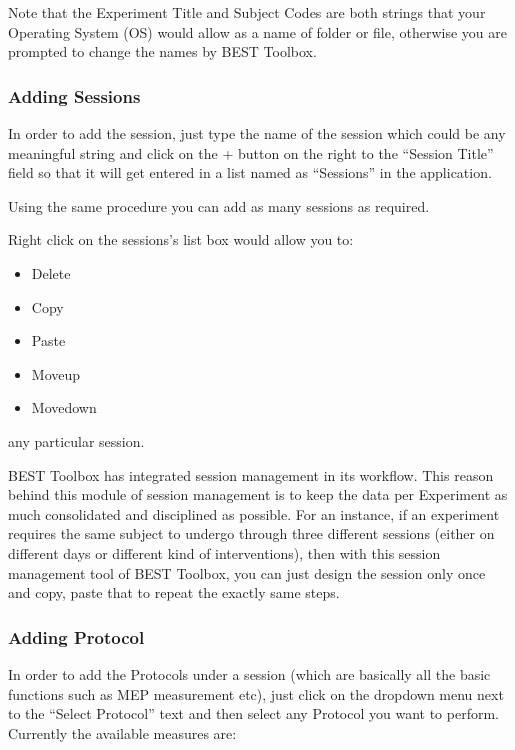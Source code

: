 \documentclass[letterpaper,10pt,english]{sphinxmanual}
\begin{document}
\sphinxAtStartPar
Note that the Experiment Title and Subject Codes are both strings that your Operating System (OS) would allow as a name of folder or file, otherwise you are prompted to change the names by BEST Toolbox.


\subsubsection{Adding Sessions}
\label{\detokenize{4_DesignExperiment:adding-sessions}}
\sphinxAtStartPar
In order to add the session, just type the name of the session which could be any meaningful string and click on the + button on the right to the “Session Title” field so that it will get entered in a list named as “Sessions” in the application.

\sphinxAtStartPar
\sphinxhyphen{}Using the same procedure you can add as many sessions as required.

\sphinxAtStartPar
\sphinxhyphen{}Right click on the sessions’s list box would allow you to:
\begin{itemize}
\item {} 
\sphinxAtStartPar
Delete

\item {} 
\sphinxAtStartPar
Copy

\item {} 
\sphinxAtStartPar
Paste

\item {} 
\sphinxAtStartPar
Moveup

\item {} 
\sphinxAtStartPar
Movedown

\end{itemize}

\sphinxAtStartPar
any particular session.

\sphinxAtStartPar
\sphinxhyphen{}BEST Toolbox has integrated session management in its workflow. This reason behind this module of session management is to keep the data per Experiment as much consolidated and disciplined as possible. For an instance, if an experiment requires the same subject to undergo through three different sessions (either on different days or different kind of interventions), then with this session management tool of BEST Toolbox, you can just design the session only once and copy, paste that to repeat the exactly same steps.


\subsubsection{Adding Protocol}
\label{\detokenize{4_DesignExperiment:adding-protocol}}
\sphinxAtStartPar
In order to add the Protocols under a session (which are basically all the basic functions such as MEP measurement etc), just click on the drop\sphinxhyphen{}down menu next to the “Select Protocol” text and then select any Protocol you want to perform. Currently the available measures are:
\end{document}
